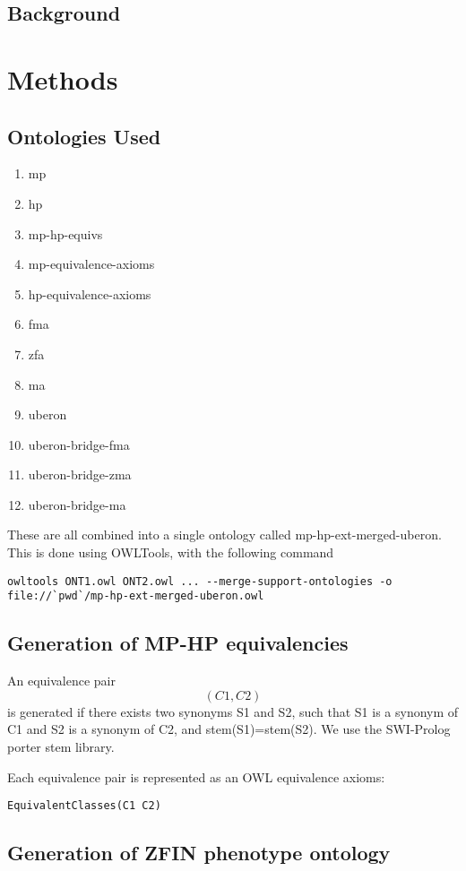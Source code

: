 
\subsection{Background}

\section{Methods}

\subsection{Ontologies Used}

\begin{enumerate}
\item mp
\item hp
\item mp-hp-equivs
\item mp-equivalence-axioms
\item hp-equivalence-axioms
\item fma
\item zfa
\item ma
\item uberon
\item uberon-bridge-fma
\item uberon-bridge-zma
\item uberon-bridge-ma
\end{enumerate}

These are all combined into a single ontology called mp-hp-ext-merged-uberon. This is done using OWLTools, with the following command

\begin{verbatim}
owltools ONT1.owl ONT2.owl ... --merge-support-ontologies -o file://`pwd`/mp-hp-ext-merged-uberon.owl
\end{verbatim}

\subsection{Generation of MP-HP equivalencies}

An equivalence pair $$(C1,C2)$$ is generated if there exists two
synonyms S1 and S2, such that S1 is a synonym of C1 and S2 is a
synonym of C2, and stem(S1)=stem(S2). We use the SWI-Prolog porter
stem library.

Each equivalence pair is represented as an OWL equivalence axioms:

\begin{verbatim}
EquivalentClasses(C1 C2)
\end{verbatim}

\subsection{Generation of ZFIN phenotype ontology}

